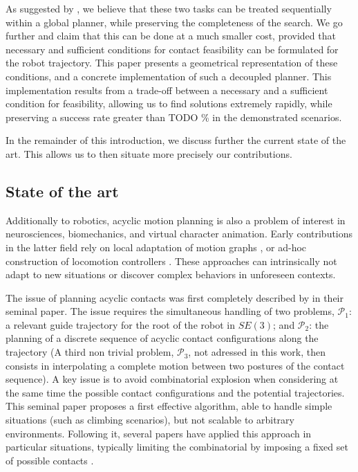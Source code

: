 As suggested by \citeauthor{Bouyarmane2009}, we believe that these two tasks can be treated sequentially within a global planner, while preserving the completeness of the search.
We go further and claim that this can be done at a much smaller cost, provided that necessary and sufficient conditions for contact feasibility can be formulated for the robot trajectory.
This paper presents a geometrical representation of these conditions, and a concrete implementation of such a decoupled planner.
This implementation results from a trade-off between a necessary and a sufficient condition for feasibility, allowing us to find solutions extremely rapidly, 
while preserving a success rate greater than TODO \% in the demonstrated scenarios.

In the remainder of this introduction, we discuss further the current state of the art. This allows us to then  situate more precisely our contributions.

\subsection{State of the art}

\newcommand{\Pa}{$\mathcal{P}_1$ }
\newcommand{\Pb}{$\mathcal{P}_2$ }

Additionally to robotics, acyclic motion planning is also a problem of interest in neurosciences, biomechanics, and virtual character animation.
Early contributions in the latter field rely on local adaptation of motion graphs \citep{citeulike:220163}, or ad-hoc construction of locomotion controllers \citep{Pettre:2003:LPD:846276.846313}. These approaches can intrinsically not  adapt to new situations or discover complex behaviors in unforeseen contexts.

The issue of planning acyclic contacts was first completely described by \citeauthor{conf/iser/BretlRLKA04} in their seminal paper. The issue requires the simultaneous handling of two problems, $\mathcal{P}_1$:  a relevant guide trajectory for the root of the robot in $SE(3)$; and $\mathcal{P}_2$: the planning of a discrete sequence of acyclic contact configurations along the trajectory (A third non trivial  problem, $\mathcal{P}_3$, not adressed in this work, then consists in interpolating a complete motion between two postures of the contact sequence).  A key issue is to avoid combinatorial explosion when considering at the same time the possible contact configurations and the potential trajectories. This seminal paper proposes a first effective algorithm, able to handle simple situations (such as climbing scenarios), but not scalable  to arbitrary environments. Following it, seve\-ral papers have applied this approach in particular situations, typically limiting the combinatorial by imposing a fixed set of possible contacts \citep{Hauser06usingmotion, stilman2010}.

